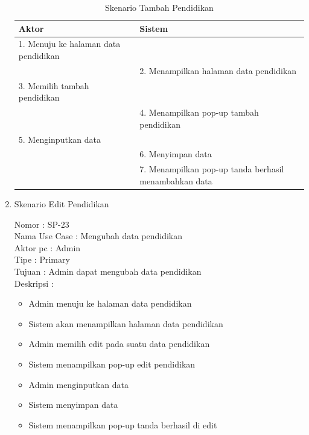 \begin{enumerate}
\begin{table}
	\caption{Skenario Tambah Pendidikan}
	\centering
	\begin{tabular}{ | l | p{65mm} |}
		\hline 
		\textbf{Aktor} & \textbf{Sistem} \\
		\hline
		
		1.	Menuju ke halaman data pendidikan &  \\
		
		\hline
		
		&  2.	Menampilkan halaman data pendidikan \\
		
		\hline
		
		3. Memilih tambah pendidikan & \\
		
		\hline
		
		& 4.	Menampilkan pop-up tambah pendidikan \\
		
		\hline
		
		5.	Menginputkan data  & \\
		\hline
		
		& 6.	Menyimpan data \\
		\hline
		
		& 7.	Menampilkan pop-up tanda berhasil menambahkan data \\
		\hline
		
	\end{tabular}
\end{table}

\item Skenario Edit Pendidikan

Nomor \kern 3.6pc : SP-23 \\
Nama Use Case : Mengubah data pendidikan \\
Aktor  pc : Admin \\
Tipe \kern 4.6pc : Primary \\
Tujuan \kern 3.6pc : Admin dapat mengubah data pendidikan \\
Deskripsi \kern 2.5pc : 

\begin{itemize}
	\item Admin menuju ke halaman data pendidikan
	\item Sistem akan menampilkan halaman data pendidikan
	\item Admin memilih edit pada suatu data pendidikan
	\item Sistem menampilkan pop-up edit pendidikan
	\item Admin menginputkan data
	\item Sistem menyimpan data
	\item Sistem menampilkan pop-up tanda berhasil di edit
	

\end{itemize}
\end{enumerate}
